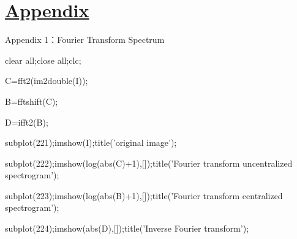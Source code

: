 \newpage


\chapter*{\protect\hyperlink{:}{Appendix}}
\thispagestyle{fancy} %
Appendix 1：Fourier Transform Spectrum

clear all;close all;clc;

C=fft2(im2double(I)); 

B=fftshift(C); %

D=ifft2(B); %

subplot(221);imshow(I);title('original image');

subplot(222);imshow(log(abs(C)+1),[]);title('Fourier transform uncentralized spectrogram');

subplot(223);imshow(log(abs(B)+1),[]);title('Fourier transform centralized spectrogram');

subplot(224);imshow(abs(D),[]);title('Inverse Fourier transform');
